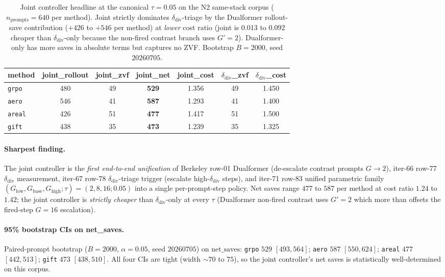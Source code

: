 \begin{table}[t]
\centering\small
\caption{Joint controller headline at the canonical $\tau{=}0.05$ on
the N2 same-stack corpus ($n_{\mathrm{prompts}}{=}640$ per method).
Joint strictly dominates $\delta_{\mathrm{div}}$-triage by the
Dualformer rollout-save contribution ($+426$ to $+546$ per method)
at \emph{lower} cost ratio (joint is $0.013$ to $0.092$ cheaper than
$\delta_{\mathrm{div}}$-only because the non-fired contrast branch uses
$G'{=}2$). Dualformer-only has more saves in absolute terms but
captures no ZVF. Bootstrap $B{=}2000$, seed $20260705$.}
\label{tab:p7-joint-controller}
\begin{tabular}{lcccccc}
\toprule
method & joint\_rollout & joint\_zvf & joint\_net & joint\_cost &
$\delta_{\mathrm{div}}$\_zvf & $\delta_{\mathrm{div}}$\_cost \\
\midrule
\texttt{grpo}  & 480 & 49 & \textbf{529} & 1.356 & 49 & 1.450 \\
\texttt{aero}  & 546 & 41 & \textbf{587} & 1.293 & 41 & 1.400 \\
\texttt{areal} & 426 & 51 & \textbf{477} & 1.417 & 51 & 1.500 \\
\texttt{gift}  & 438 & 35 & \textbf{473} & 1.239 & 35 & 1.325 \\
\bottomrule
\end{tabular}
\end{table}

\paragraph{Sharpest finding.}
The joint controller is the \emph{first end-to-end unification} of
Berkeley row-01 Dualformer (de-escalate contrast prompts $G{\to}2$),
iter-66 row-77 $\delta_{\mathrm{div}}$ measurement, iter-67 row-78
$\delta_{\mathrm{div}}$-triage trigger (escalate high-$\delta_{\mathrm{div}}$
steps), and iter-71 row-83 unified parametric family
$(G_{\mathrm{low}}, G_{\mathrm{base}}, G_{\mathrm{high}}; \tau)
= (2, 8, 16; 0.05)$ into a single per-prompt-step policy. Net saves
range $477$ to $587$ per method at cost ratio $1.24$ to $1.42$; the
joint controller is \emph{strictly cheaper} than
$\delta_{\mathrm{div}}$-only at every $\tau$ (Dualformer non-fired
contrast uses $G'{=}2$ which more than offsets the fired-step $G{=}16$
escalation).

\paragraph{95\% bootstrap CIs on net\_saves.}
Paired-prompt bootstrap ($B{=}2000$, $\alpha{=}0.05$, seed $20260705$)
on $\mathrm{net\_saves}$: \texttt{grpo} $529$ $[493, 564]$;
\texttt{aero} $587$ $[550, 624]$; \texttt{areal} $477$ $[442, 513]$;
\texttt{gift} $473$ $[438, 510]$. All four CIs are tight (width
$\sim 70$ to $75$), so the joint controller's net saves is statistically
well-determined on this corpus.

